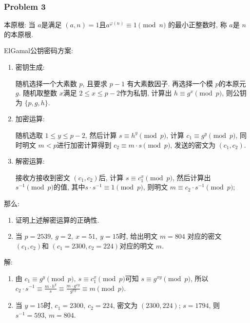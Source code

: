 \documentclass[a4paper,12pt]{ctexart}
\begin{document}
\subsubsection*{Problem 3}
    本原根: 当 $ a $是满足 $(a,n)=1 $且$ a^{\varphi(n)}\equiv 1 \pmod{n} $ 的最小正整数时, 称 $ a $是 $ n $的本原根. 

    ElGamal公钥密码方案: 
    \begin{enumerate}[label=(\arabic*)]
        \item 密钥生成:
        
        随机选择一个大素数 $p$, 且要求 $ p-1 $ 有大素数因子. 再选择一个模 $ p$的本原元 $ g $. 
        随机取整数 $ x $满足 $ 2\le x\le p-2 $作为私钥, 计算出 $ h\equiv g^x\pmod{p} $, 则公钥为 $ \{p,g,h\} $.

        \item 加密运算:
        
        随机选取 $ 1\le y\le p-2 $, 然后计算 $ s\equiv h^y\pmod{p} $, 计算 $ c_1\equiv g^y\pmod{p} $, 同时明文 $ m<p $进行加密计算得到 $ c_2\equiv m\cdot s\pmod{p} $, 发送的密文为 $ (c_1,c_2) $.

        \item 解密运算:
        
        接收方接收到密文 $ (c_1,c_2) $后, 计算 $ s\equiv c_1^x\pmod{p} $, 然后计算出 $ s^{-1}\pmod{p} $的值, 其中$ s\cdot s^{-1}\equiv 1\pmod{p} $, 则明文 $ m\equiv c_2\cdot s^{-1}\pmod{p} $;
    \end{enumerate}
    那么: 
    \begin{enumerate}[label=(\arabic*)]
        \item 证明上述解密运算的正确性. 
        \item 当 $ p=2539, ~g=2, ~x=51,~y=15 $时, 给出明文 $ m=804 $ 对应的密文 $ (c_1,c_2) $和 $ (c_1=2300,c_2=224) $对应的明文 $ m $.
    \end{enumerate}
    解:\begin{enumerate}[label=(\arabic*)]
        \item 由 $ c_1\equiv g^y\pmod{p},~ s\equiv c_1^x\pmod{p} $可知 $ s\equiv g^{xy}\pmod{p} $, 所以 $ c_2\cdot s^{-1}\equiv \frac{m\cdot h^y}{s}\equiv\frac{m\cdot g^{xy}}{g^{xy}}\equiv m\pmod{p}  $.
        \item 当 $ y=15 $时, $ c_1=2300,~c_2=224 $, 密文为 $ (2300,224) $; $ s=1794 $, 则 $ s^{-1}=593 $, $ m=804 $.
    \end{enumerate}
\end{document}
